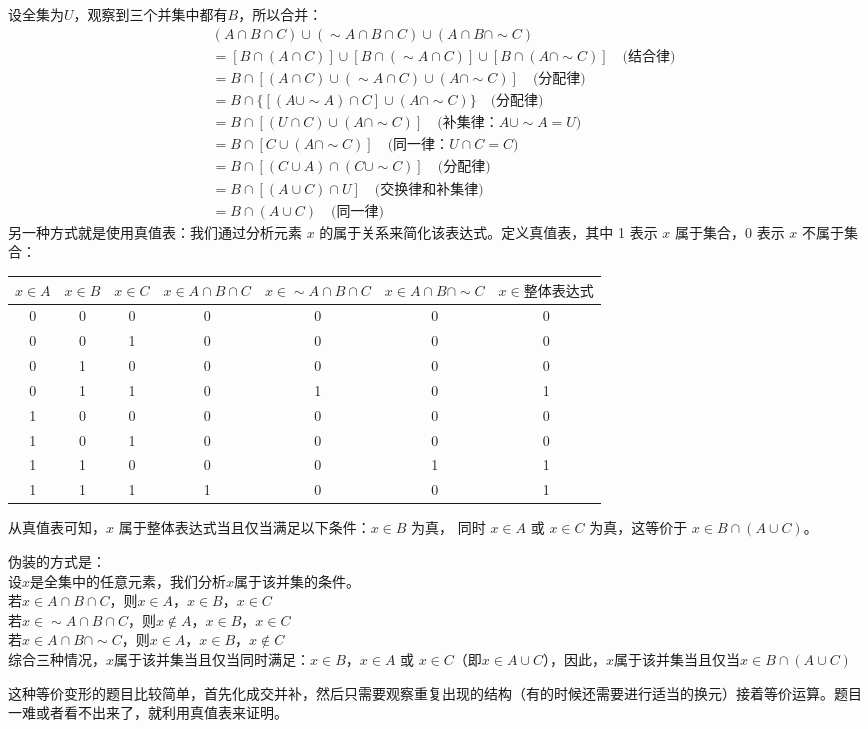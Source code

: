 \documentclass[lang=cn,11pt]{elegantbook}
\begin{document}
\begin{solution}设全集为$U$，观察到三个并集中都有$B$，所以合并：
    \begin{align*}
& (A \cap B \cap C) \cup (\sim A \cap B \cap C) \cup (A \cap B \cap \sim C) \\
&= [B \cap (A \cap C)] \cup [B \cap (\sim A \cap C)] \cup [B \cap (A \cap \sim C)] \quad \text{(结合律)} \\
&= B \cap [(A \cap C) \cup (\sim A \cap C) \cup (A \cap \sim C)] \quad \text{(分配律)} \\
&= B \cap \{[(A \cup \sim A) \cap C] \cup (A \cap \sim C)\} \quad \text{(分配律)} \\
&= B \cap [(U \cap C) \cup (A \cap \sim C)] \quad \text{(补集律：$A \cup \sim A = U$)} \\
&= B \cap [C \cup (A \cap \sim C)] \quad \text{(同一律：$U \cap C = C$)} \\
&= B \cap [(C \cup A) \cap (C \cup \sim C)] \quad \text{(分配律)} \\
&= B \cap [(A \cup C) \cap U] \quad \text{(交换律和补集律)} \\
&= B \cap (A \cup C) \quad \text{(同一律)}
\end{align*}
另一种方式就是使用真值表：我们通过分析元素 $x$ 的属于关系来简化该表达式。定义真值表，其中 1 表示 $x$ 属于集合，0 表示 $x$ 不属于集合：
\begin{center}
\begin{tabular}{ccc|cccc}
$x \in A$ & $x \in B$ & $x \in C$ & $x \in A \cap B \cap C$ & $x \in \sim A \cap B \cap C$ & $x \in A \cap B \cap \sim C$ & $x \in \text{整体表达式}$ \\
\hline
0 & 0 & 0 & 0 & 0 & 0 & 0 \\
0 & 0 & 1 & 0 & 0 & 0 & 0 \\
0 & 1 & 0 & 0 & 0 & 0 & 0 \\
0 & 1 & 1 & 0 & 1 & 0 & 1 \\
1 & 0 & 0 & 0 & 0 & 0 & 0 \\
1 & 0 & 1 & 0 & 0 & 0 & 0 \\
1 & 1 & 0 & 0 & 0 & 1 & 1 \\
1 & 1 & 1 & 1 & 0 & 0 & 1 \\
\end{tabular}
\end{center}
从真值表可知，$x$ 属于整体表达式当且仅当满足以下条件：$x \in B$ 为真， 同时 $x \in A$ 或 $x \in C$ 为真，这等价于 $x \in B \cap (A \cup C)$。

伪装的方式是：\\
设$x$是全集中的任意元素，我们分析$x$属于该并集的条件。\\
若$x \in A \cap B \cap C$，则$x \in A$，$x \in B$，$x \in C$\\
若$x \in \sim A \cap B \cap C$，则$x \notin A$，$x \in B$，$x \in C$\\
若$x \in A \cap B \cap \sim C$，则$x \in A$，$x \in B$，$x \notin C$\\
综合三种情况，$x$属于该并集当且仅当同时满足：$x \in B$，$x \in A$ 或 $x \in C$（即$x \in A \cup C$），因此，$x$属于该并集当且仅当$x \in B \cap (A \cup C)$
\end{solution}
这种等价变形的题目比较简单，首先化成交并补，然后只需要观察重复出现的结构（有的时候还需要进行适当的换元）接着等价运算。题目一难或者看不出来了，就利用真值表来证明。
\end{document}
